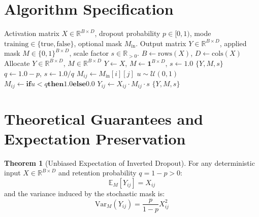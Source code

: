 \documentclass[11pt,a4paper]{article}
\theoremstyle{definition}
\newtheorem{theorem}{Theorem}[section]
\begin{document}
\section{Algorithm Specification}

\begin{algorithm}[H]
\caption{Inverted Dropout Forward Execution}
\label{alg:dropout_inverted}
\begin{algorithmic}[1]
\Require Activation matrix $X \in \mathbb{R}^{B \times D}$, dropout probability $p \in [0, 1)$, mode $\text{training} \in \{\text{true}, \text{false}\}$, optional mask $M_{\text{in}}$.
\Ensure Output matrix $Y \in \mathbb{R}^{B \times D}$, applied mask $M \in \{0, 1\}^{B \times D}$, scale factor $s \in \mathbb{R}_{> 0}$.
\State $B \gets \text{rows}(X)$, $D \gets \text{cols}(X)$
\State Allocate $Y \in \mathbb{R}^{B \times D}$, $M \in \mathbb{R}^{B \times D}$
    \State $Y \gets X$, $M \gets \mathbf{1}^{B \times D}$, $s \gets 1.0$
    \State \Return $\{Y, M, s\}$
\EndIf
\State $q \gets 1.0 - p$, $s \gets 1.0 / q$
            \State $M_{ij} \gets M_{\text{in}}[i][j]$
        \Else
            \State $u \sim \mathcal{U}(0, 1)$
            \State $M_{ij} \gets \mathbf{if } u < q \mathbf{ then } 1.0 \mathbf{ else } 0.0$
        \EndIf
        \State $Y_{ij} \gets X_{ij} \cdot M_{ij} \cdot s$
    \EndFor
\EndFor
\State \Return $\{Y, M, s\}$
\end{algorithmic}
\end{algorithm}

\section{Theoretical Guarantees and Expectation Preservation}

\begin{theorem}[Unbiased Expectation of Inverted Dropout]
For any deterministic input $X \in \mathbb{R}^{B \times D}$ and retention probability $q = 1 - p > 0$:
\begin{equation}
\mathbb{E}_M [Y_{ij}] = X_{ij}
\end{equation}
and the variance induced by the stochastic mask is:
\begin{equation}
\text{Var}_M(Y_{ij}) = \frac{p}{1 - p} X_{ij}^2
\end{equation}
\end{theorem}
\end{document}
